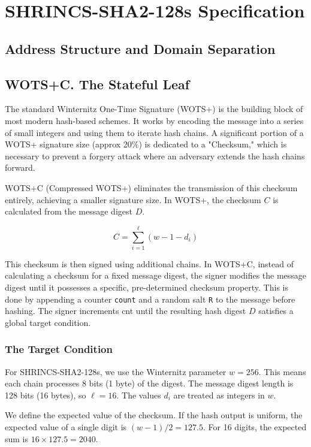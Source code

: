 \section{SHRINCS-SHA2-128s Specification}

\subsection{Address Structure and Domain Separation}

\subsection{WOTS+C. The Stateful Leaf}
The standard Winternitz One-Time Signature (WOTS+) is the building block of most modern hash-based 
schemes. It works by encoding the message into a series of small integers and using them to iterate 
hash chains. A significant portion of a WOTS+ signature size (approx 20\%) is dedicated to a 
"Checksum," which is necessary to prevent a forgery attack where an adversary extends the hash 
chains forward.

WOTS+C (Compressed WOTS+) eliminates the transmission of this checksum entirely, achieving a smaller 
signature size. In WOTS+, the checksum $C$ is calculated from the message digest $D$.

$$C = \sum_{i=1}^{\ell} (w - 1 - d_i)$$

This checksum is then signed using additional chains. In WOTS+C, instead of calculating a checksum 
for a fixed message digest, the signer modifies the message digest until it possesses a specific, 
pre-determined checksum property. This is done by appending a counter \texttt{count} and a random 
salt \texttt{R} to the message before hashing. The signer increments cnt until the resulting hash digest 
$D$ satisfies a global target condition.

\subsubsection{The Target Condition}
For SHRINCS-SHA2-128s, we use the Winternitz parameter $w=256$. This means each chain processes 8 
bits (1 byte) of the digest. The message digest length is 128 bits (16 bytes), so $\ell = 16$. The 
values $d_i$ are treated as integers in $w$.

We define the expected value of the checksum. If the hash output is uniform, the expected value of a 
single digit is $(w-1)/2 = 127.5$. For 16 digits, the expected sum is $16 \times 127.5 = 2040$.

